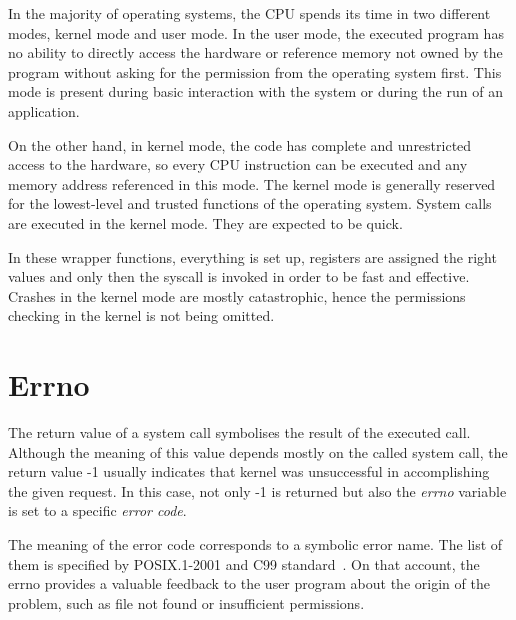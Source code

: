  In the majority of operating systems, the CPU spends its time in two different modes, kernel mode and user mode. In the user mode, the executed program has no ability to directly access the hardware or reference memory not owned by the program without asking for the permission from the operating system first. This mode is present during basic interaction with the system or during the run of an application.
 
 On the other hand, in kernel mode, the code has complete and unrestricted access to the hardware, so every CPU instruction can be executed and any memory address referenced in this mode. The kernel mode is generally reserved for the lowest-level and trusted functions of the operating system. System calls are executed in the kernel mode. They are expected to be quick.
 
  In these wrapper functions, everything is set up, registers are assigned the right values and only then the syscall is invoked in order to be fast and effective.
 Crashes in the kernel mode are mostly catastrophic, hence the permissions checking in the kernel is not being omitted.

\section{ Errno }

The return value of a system call symbolises the result of the executed call. Although the meaning of this value depends mostly on the called system call, the return value -1 usually indicates that kernel was unsuccessful in accomplishing the given request. In this case, not only -1 is returned but also the \textit{errno} variable is set to a specific \textit{error code}.

The meaning of the error code corresponds to a symbolic error name. The list of them is specified by POSIX.1-2001 and C99 standard~\cite{Man_errno}. On that account, the errno provides a valuable feedback to the user program about the origin of the problem, such as file not found or insufficient permissions.